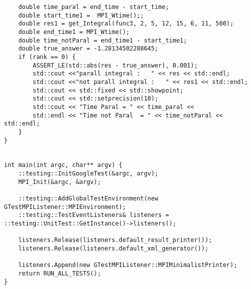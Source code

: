 \documentclass{report}
\begin{document}
\begin{lstlisting}
    double time_paral = end_time - start_time;
    double start_time1 =  MPI_Wtime();;
    double res1 = get_Integral(func3, 2, 5, 12, 15, 6, 11, 500);
    double end_time1 = MPI_Wtime();
    double time_notParal = end_time1 - start_time1;
    double true_answer = -1.28134502288645;
    if (rank == 0) {
        ASSERT_LE(std::abs(res - true_answer), 0.001);
        std::cout <<"parall integral :   " << res << std::endl;
        std::cout <<"not parall integral :   " << res1 << std::endl;
        std::cout << std::fixed << std::showpoint;
        std::cout << std::setprecision(10);
        std::cout << "Time Paral = " << time_paral <<
        std::endl << "Time not Paral  = " << time_notParal << std::endl;
    }
}


int main(int argc, char** argv) {
    ::testing::InitGoogleTest(&argc, argv);
    MPI_Init(&argc, &argv);

    ::testing::AddGlobalTestEnvironment(new GTestMPIListener::MPIEnvironment);
    ::testing::TestEventListeners& listeners = ::testing::UnitTest::GetInstance()->listeners();

    listeners.Release(listeners.default_result_printer());
    listeners.Release(listeners.default_xml_generator());

    listeners.Append(new GTestMPIListener::MPIMinimalistPrinter);
    return RUN_ALL_TESTS();
}
\end{lstlisting}
\end{document}
